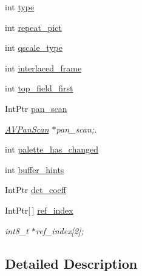 \begin{DoxyCompactItemize}
int \hyperlink{struct_tao_1_1_f_fmpeg_1_1_f_fmpeg_1_1_a_v_frame_a4ecb65b3e9f921061be282b29c450bc1}{type}
\item 
int \hyperlink{struct_tao_1_1_f_fmpeg_1_1_f_fmpeg_1_1_a_v_frame_ab94c25f63dd99b267738a1e48ebfdbc8}{repeat\_\-pict}
\item 
int \hyperlink{struct_tao_1_1_f_fmpeg_1_1_f_fmpeg_1_1_a_v_frame_a76568fa6d51ac1385878c5efe9a49af0}{qscale\_\-type}
\item 
int \hyperlink{struct_tao_1_1_f_fmpeg_1_1_f_fmpeg_1_1_a_v_frame_a96affed479a6316abfc0f7a33eb02807}{interlaced\_\-frame}
\item 
int \hyperlink{struct_tao_1_1_f_fmpeg_1_1_f_fmpeg_1_1_a_v_frame_a1205dddaf9d624918517d93cef82aed0}{top\_\-field\_\-first}
\item 
IntPtr \hyperlink{struct_tao_1_1_f_fmpeg_1_1_f_fmpeg_1_1_a_v_frame_a08f1d39a5c2b75e018d64036607f86eb}{pan\_\-scan}
\begin{DoxyCompactList}\small\item\em \hyperlink{struct_tao_1_1_f_fmpeg_1_1_f_fmpeg_1_1_a_v_pan_scan}{AVPanScan} $\ast$pan\_\-scan;. \item\end{DoxyCompactList}\item 
int \hyperlink{struct_tao_1_1_f_fmpeg_1_1_f_fmpeg_1_1_a_v_frame_a38c428a4f41cfeff795c51d747421803}{palette\_\-has\_\-changed}
\item 
int \hyperlink{struct_tao_1_1_f_fmpeg_1_1_f_fmpeg_1_1_a_v_frame_afcc4c4e26211e53450c885f083345f4f}{buffer\_\-hints}
\item 
IntPtr \hyperlink{struct_tao_1_1_f_fmpeg_1_1_f_fmpeg_1_1_a_v_frame_a3bef657aaf7a6fb84de9546353c75e86}{dct\_\-coeff}
\item 
IntPtr\mbox{[}$\,$\mbox{]} \hyperlink{struct_tao_1_1_f_fmpeg_1_1_f_fmpeg_1_1_a_v_frame_a776a09ab7c80f6cca5cb7c1a813b2740}{ref\_\-index}
\begin{DoxyCompactList}\small\item\em int8\_\-t $\ast$ref\_\-index\mbox{[}2\mbox{]}; \item\end{DoxyCompactList}\end{DoxyCompactItemize}


\subsection{Detailed Description}


